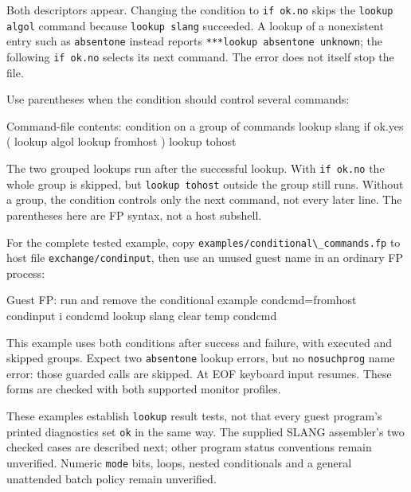 Both descriptors appear. Changing the condition to \passthrough{\lstinline!if ok.no!} skips the \passthrough{\lstinline!lookup algol!} command because \passthrough{\lstinline!lookup slang!} succeeded. A lookup of a nonexistent entry such as \passthrough{\lstinline!absentone!} instead reports \passthrough{\lstinline!***lookup absentone unknown!}; the following \passthrough{\lstinline!if ok.no!} selects its next command. The error does not itself stop the file.

Use parentheses when the condition should control several commands:

\begin{commandexample}{Command-file contents: condition on a group of commands}
lookup slang
if ok.yes
(
lookup algol
lookup fromhost
)
lookup tohost
\end{commandexample}

The two grouped lookups run after the successful lookup. With \passthrough{\lstinline!if ok.no!} the whole group is skipped, but \passthrough{\lstinline!lookup tohost!} outside the group still runs. Without a group, the condition controls only the next command, not every later line. The parentheses here are FP syntax, not a host subshell.

For the complete tested example, copy \passthrough{\lstinline!examples/conditional\_commands.fp!} to host file \passthrough{\lstinline!exchange/condinput!}, then use an unused guest name in an ordinary FP process:

\begin{commandexample}{Guest FP: run and remove the conditional example}
condcmd=fromhost condinput
i condcmd
lookup slang
clear temp condcmd
\end{commandexample}

This example uses both conditions after success and failure, with executed and
skipped groups. Expect two \texttt{absentone} lookup errors, but no
\texttt{nosuchprog} name error: those guarded calls are skipped. At EOF keyboard
input resumes. These forms are checked with both supported monitor profiles.

These examples establish \passthrough{\lstinline!lookup!} result tests, not that every guest program's printed diagnostics set \passthrough{\lstinline!ok!} in the same way. The supplied SLANG assembler's two checked cases are described next; other program status conventions remain unverified. Numeric \passthrough{\lstinline!mode!} bits, loops, nested conditionals and a general unattended batch policy remain unverified.

